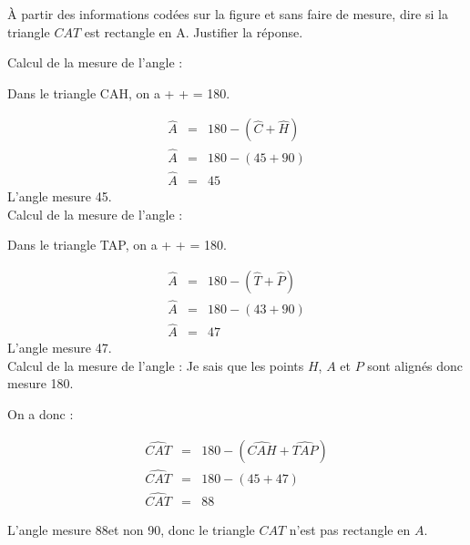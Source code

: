 	\begin{questions}
		\question \`A partir des informations codées sur la figure et sans faire de mesure, dire si la triangle $CAT$ est rectangle en A. Justifier la réponse.
	\end{questions}
	\begin{solution}
		Calcul de la mesure de l'angle  :
		
		Dans le triangle CAH, on a  +  +  = 180\degree.
		
			\begin{eqnarray*}
				\widehat{A}  &=& 180 - (\widehat{C} + \widehat{H}) \\
				\widehat{A}  &=& 180 - (45 + 90) \\
				\widehat{A}  &=& 45
			\end{eqnarray*}
		L'angle  mesure 45\degree.\\
		
		
		
		Calcul de la mesure de l'angle  :
		
		Dans le triangle TAP, on a  +  +  = 180\degree.
		
		\begin{eqnarray*}
			\widehat{A}  &=& 180 - (\widehat{T} + \widehat{P}) \\
			\widehat{A}  &=& 180 - (43 + 90) \\
			\widehat{A}  &=& 47
		\end{eqnarray*}
		L'angle  mesure 47\degree.\\
		
		Calcul de la mesure de l'angle  :
		Je sais que les points $H$, $A$ et $P$ sont alignés donc  mesure 180\degree.
		
		On a donc :
		
		\begin{eqnarray*}
			\widehat{CAT}  &=& 180 - (\widehat{CAH} + \widehat{TAP}) \\
			\widehat{CAT}  &=& 180 - (45 + 47) \\
			\widehat{CAT}  &=& 88
		\end{eqnarray*}
	
		L'angle  mesure 88\degree et non 90\degree, donc le triangle $CAT$ n'est pas rectangle en $A$.
	\end{solution}



	
